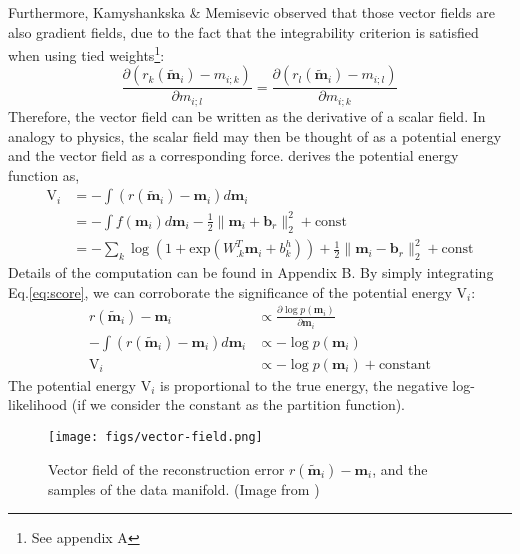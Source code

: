 \documentclass[12pt]{report}
\begin{document}
\indent Furthermore, Kamyshankska \& Memisevic\cite{potentialenergy} observed that those vector fields are also gradient fields, due to the fact that the integrability criterion is satisfied when using tied weights\footnote{See appendix A}:
\begin{equation}
\frac{\partial(r_k(\tilde{\textbf{m}}_i)- m_{i;k})}{\partial m_{i;l}} = \frac{\partial(r_l(\tilde{\textbf{m}}_i)- m_{i;l})}{\partial m_{i;k}}
\end{equation} 
Therefore, the vector field can be written as the derivative of a scalar field. In analogy to physics, the scalar field may then be thought of as a potential energy and the vector field as a corresponding force. \cite{potentialenergy} derives the potential energy function as,
\begin{equation}
\begin{split}
\mathrm{V}_i &= -\int (r(\tilde{\textbf{m}}_i) - \textbf{m}_i)d\textbf{m}_i  \\
&= -\int f(\textbf{m}_i)d\textbf{m}_i - \frac{1}{2} \lVert \textbf{m}_i + \textbf{b}_r \rVert_2^2 + \text{const} \\
&= -\sum_k \log(1 + \text{exp}(W_{.k}^T \textbf{m}_i + b_k^h)) + \frac{1}{2} \lVert \textbf{m}_i - \textbf{b}_r \rVert_2^2 + \text{const}
\end{split}
\end{equation}
Details of the computation can be found in Appendix B.  By simply integrating Eq.\ref{eq:score}, we can corroborate the significance of the potential energy $\mathrm{V}_i$:
\begin{equation}
\begin{split}
r(\tilde{\textbf{m}}_i) - \textbf{m}_i &\propto \frac{\partial \log p(\textbf{m}_i)}{\partial \textbf{m}_i} \\
-\int (r(\tilde{\textbf{m}}_i) - \textbf{m}_i)d\textbf{m}_i &\propto -\log p(\textbf{m}_i) \\
\mathrm{V}_i &\propto -\log p(\textbf{m}_i) + \text{constant}
\end{split}
\label{eq:shape-potential}
\end{equation}
The potential energy $\mathrm{V}_i$ is proportional to the true energy, the negative log-likelihood (if we consider the constant as the partition function).

\begin{figure}[!htbp]
\centering
\texttt{[image: figs/vector-field.png]}
\caption{Vector field of the reconstruction error $r(\tilde{\textbf{m}}_i) - \textbf{m}_i$, and the samples of the data manifold. (Image from \cite{alainbengio})}
\label{fig:vfield}
\end{figure}
\end{document}
